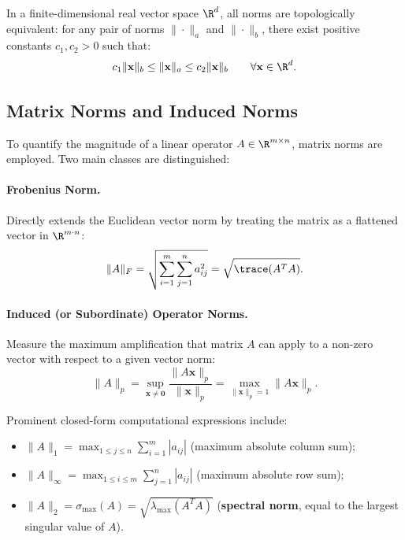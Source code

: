 \begin{property}
In a finite-dimensional real vector space $\R^d$, all norms are topologically equivalent: for any pair of norms $\|\cdot\|_a$ and $\|\cdot\|_b$, there exist positive constants $c_1, c_2 > 0$ such that:
\begin{equation}
    c_1 \|\mathbf{x}\|_b \le \|\mathbf{x}\|_a \le c_2 \|\mathbf{x}\|_b \qquad \forall \mathbf{x} \in \R^d.
\end{equation}
\end{property}

\subsection{Matrix Norms and Induced Norms}

To quantify the magnitude of a linear operator $A \in \R^{m \times n}$, matrix norms are employed. Two main classes are distinguished:

\paragraph{Frobenius Norm.}
Directly extends the Euclidean vector norm by treating the matrix as a flattened vector in $\R^{m \cdot n}$:
\begin{equation}
    \|A\|_F = \sqrt{\sum_{i=1}^m \sum_{j=1}^n a_{ij}^2} = \sqrt{\trace(A^T A)}.
\end{equation}

\paragraph{Induced (or Subordinate) Operator Norms.}
Measure the maximum amplification that matrix $A$ can apply to a non-zero vector with respect to a given vector norm:
\begin{equation}
    \|A\|_p = \sup_{\mathbf{x} \ne \mathbf{0}} \frac{\|A \mathbf{x}\|_p}{\|\mathbf{x}\|_p} = \max_{\|\mathbf{x}\|_p = 1} \|A \mathbf{x}\|_p.
\end{equation}

Prominent closed-form computational expressions include:
\begin{itemize}
    \item $\|A\|_1 = \max_{1 \le j \le n} \sum_{i=1}^m |a_{ij}|$ (maximum absolute column sum);
    \item $\|A\|_\infty = \max_{1 \le i \le m} \sum_{j=1}^n |a_{ij}|$ (maximum absolute row sum);
    \item $\|A\|_2 = \sigma_{\max}(A) = \sqrt{\lambda_{\max}(A^T A)}$ (\textbf{spectral norm}, equal to the largest singular value of $A$).
\end{itemize}

